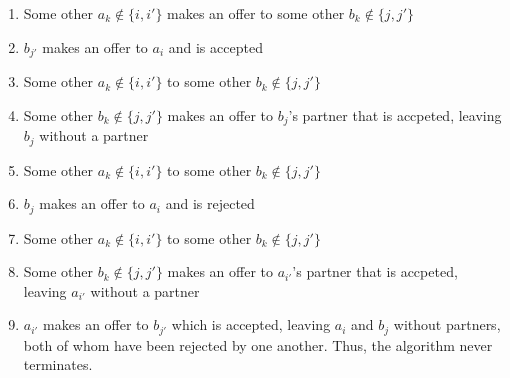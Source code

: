 \documentclass{article}
\begin{document}
\begin{enumerate}[a)]
\begin{enumerate}[1.]
        \item Some other $a_k \notin \{i, i'\}$ makes an offer to some other $b_k \notin \{j, j'\}$
        \item $b_{j'}$ makes an offer to $a_{i}$ and is accepted
        \item Some other $a_k \notin \{i, i'\}$ to some other $b_k \notin \{j, j'\}$
        \item Some other $b_k \notin \{j, j'\}$ makes an offer to $b_j$'s partner that is accpeted, leaving $b_{j}$ without a partner
        \item Some other $a_k \notin \{i, i'\}$ to some other $b_k \notin \{j, j'\}$
        \item $b_{j}$ makes an offer to $a_{i}$ and is rejected
        \item Some other $a_k \notin \{i, i'\}$ to some other $b_k \notin \{j, j'\}$
        \item Some other $b_k \notin \{j, j'\}$ makes an offer to $a_{i'}$'s partner that is accpeted, leaving $a_{i'}$ without a partner
        \item $a_{i'}$ makes an offer to $b_{j'}$ which is accepted, leaving $a_i$ and $b_j$ without partners, both of whom have been rejected by one another. Thus, the algorithm never terminates.
    \end{enumerate}
\end{enumerate}
\end{document}
